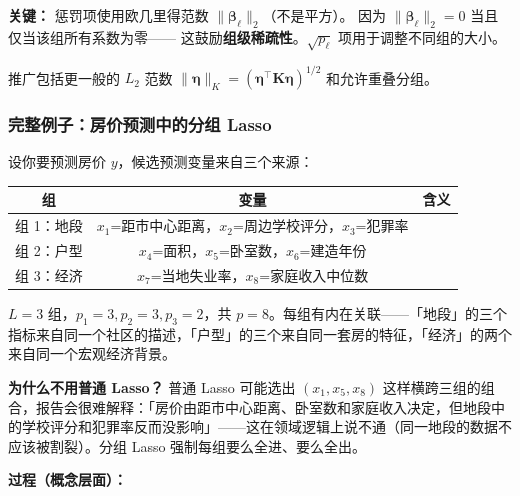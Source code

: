 \textbf{关键：} 惩罚项使用欧几里得范数 $\|\bm{\beta}_\ell\|_2$（不是平方）。
因为 $\|\bm{\beta}_\ell\|_2 = 0$ 当且仅当该组所有系数为零——
这鼓励\textbf{组级稀疏性}。$\sqrt{p_\ell}$ 项用于调整不同组的大小。

推广包括更一般的 $L_2$ 范数 $\|\bm{\eta}\|_K = (\bm{\eta}^\top \mathbf{K}\bm{\eta})^{1/2}$
和允许重叠分组。

\subsubsection{完整例子：房价预测中的分组 Lasso}

设你要预测房价 $y$，候选预测变量来自三个来源：

\begin{center}
\renewcommand{\arraystretch}{1.3}
\begin{tabular}{c|c|c}
\toprule
\textbf{组} & \textbf{变量} & \textbf{含义} \\
\midrule
组 1：地段 & $x_1$=距市中心距离，$x_2$=周边学校评分，$x_3$=犯罪率 \\
组 2：户型 & $x_4$=面积，$x_5$=卧室数，$x_6$=建造年份 \\
组 3：经济 & $x_7$=当地失业率，$x_8$=家庭收入中位数 \\
\bottomrule
\end{tabular}
\end{center}

$L=3$ 组，$p_1=3, p_2=3, p_3=2$，共 $p=8$。每组有内在关联——「地段」的三个指标来自同一个社区的描述，「户型」的三个来自同一套房的特征，「经济」的两个来自同一个宏观经济背景。

\textbf{为什么不用普通 Lasso？} 普通 Lasso 可能选出 $(x_1, x_5, x_8)$ 这样横跨三组的组合，报告会很难解释：「房价由距市中心距离、卧室数和家庭收入决定，但地段中的学校评分和犯罪率反而没影响」——这在领域逻辑上说不通（同一地段的数据不应该被割裂）。分组 Lasso 强制每组要么全进、要么全出。

\textbf{过程（概念层面）：}

